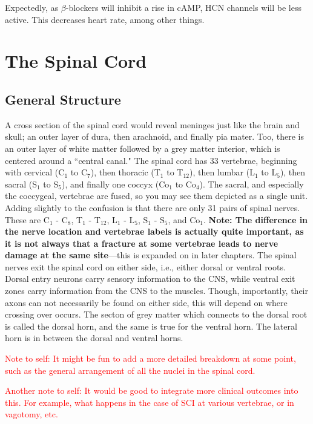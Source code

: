 \documentclass[12pt]{report}
\begin{document}
Expectedly, as $\beta$-blockers will inhibit a rise in cAMP, HCN channels will be less active. This decreases heart rate, among other things. 





\chapter{The Spinal Cord}

\section{General Structure}
A cross section of the spinal cord would reveal meninges just like the brain and skull; an outer layer of dura, then arachnoid, and finally pia mater. Too, there is an outer layer of white matter followed by a grey matter interior, which is centered around a ``central canal." The spinal cord has 33 vertebrae, beginning with cervical (C$_1$ to C$_7$), then thoracic (T$_1$ to T$_{12}$), then lumbar (L$_1$ to L$_5$), then sacral (S$_1$ to S$_5$), and finally one coccyx (Co$_1$ to Co$_4$). The sacral, and especially the coccygeal, vertebrae are fused, so you may see them depicted as a single unit. Adding slightly to the confusion is that there are only 31 pairs of spinal nerves. These are C$_1$ - C$_8$, T$_1$ - T$_{12}$, L$_1$ - L$_5$, S$_1$ - S$_5$, and Co$_1$. \textbf{Note: The difference in the nerve location and vertebrae labels is actually quite important, as it is not always that a fracture at some vertebrae leads to nerve damage at the same site}---this is expanded on in later chapters. The spinal nerves exit the spinal cord on either side, i.e., either dorsal or ventral roots. Dorsal entry neurons carry sensory information to the CNS, while ventral exit zones carry information from the CNS to the muscles. Though, importantly, their axons can not necessarily be found on either side, this will depend on where crossing over occurs. The secton of grey matter which connects to the dorsal root is called the dorsal horn, and the same is true for the ventral horn. The lateral horn is in between the dorsal and ventral horns.\newline

\textcolor{red}{Note to self: It might be fun to add a more detailed breakdown at some point, such as the general arrangement of all the nuclei in the spinal cord.}\newline

\textcolor{red}{Another note to self: It would be good to integrate more clinical outcomes into this. For example, what happens in the case of SCI at various vertebrae, or in vagotomy, etc.}
\end{document}
